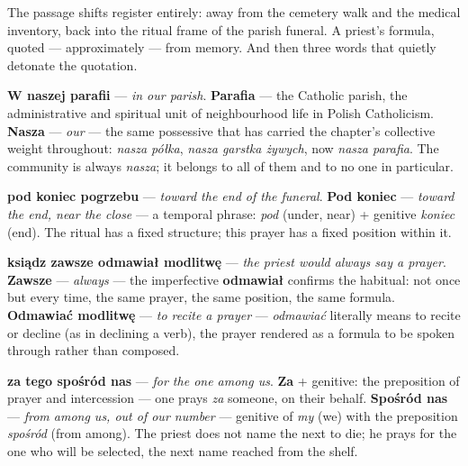 

The passage shifts register entirely: away from the
cemetery walk and the medical inventory, back into the
ritual frame of the parish funeral. A priest's formula,
quoted --- approximately --- from memory. And then three
words that quietly detonate the quotation.

\textbf{W naszej parafii} --- \textit{in our parish}.
\textbf{Parafia} --- the Catholic parish, the administrative
and spiritual unit of neighbourhood life in Polish
Catholicism. \textbf{Nasza} --- \textit{our} --- the same
possessive that has carried the chapter's collective
weight throughout: \textit{nasza półka}, \textit{nasza
garstka żywych}, now \textit{nasza parafia}. The community
is always \textit{nasza}; it belongs to all of them and
to no one in particular.

\textbf{pod koniec pogrzebu} --- \textit{toward the end of
the funeral}. \textbf{Pod koniec} --- \textit{toward the
end, near the close} --- a temporal phrase: \textit{pod}
(under, near) + genitive \textit{koniec} (end). The ritual
has a fixed structure; this prayer has a fixed position
within it.

\textbf{ksiądz zawsze odmawiał modlitwę} --- \textit{the
priest would always say a prayer}. \textbf{Zawsze} ---
\textit{always} --- the imperfective \textbf{odmawiał}
confirms the habitual: not once but every time, the same
prayer, the same position, the same formula. \textbf{Odmawiać
modlitwę} --- \textit{to recite a prayer} --- \textit{odmawiać}
literally means to recite or decline (as in declining a
verb), the prayer rendered as a formula to be spoken
through rather than composed.

\textbf{za tego spośród nas} --- \textit{for the one among
us}. \textbf{Za} + genitive: the preposition of prayer and
intercession --- one prays \textit{za} someone, on their
behalf. \textbf{Spośród nas} --- \textit{from among us,
out of our number} --- genitive of \textit{my} (we) with
the preposition \textit{spośród} (from among). The priest
does not name the next to die; he prays for the one who
will be selected, the next name reached from the shelf.

